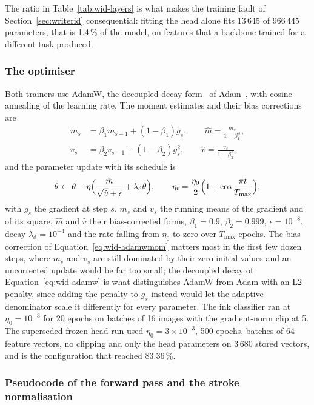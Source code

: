 The ratio in Table~\ref{tab:wid-layers} is what makes the training fault of Section~\ref{sec:writerid} consequential: fitting the head alone fits 13\,645 of 966\,445 parameters, that is 1.4\,\% of the model, on features that a backbone trained for a different task produced.

\subsubsection{The optimiser}

Both trainers use AdamW, the decoupled-decay form~\cite{loshchilov2019} of Adam~\cite{kingma2015}, with cosine annealing of the learning rate.
The moment estimates and their bias corrections are
\begin{align}
m_s&=\beta_1m_{s-1}+(1-\beta_1)g_s,\qquad \hat m=\frac{m_s}{1-\beta_1^{\,s}},\nonumber\\
v_s&=\beta_2v_{s-1}+(1-\beta_2)g_s^2,\qquad \hat v=\frac{v_s}{1-\beta_2^{\,s}},\label{eq:wid-adamwmom}
\end{align}
and the parameter update with its schedule is
\begin{equation}
\theta\leftarrow\theta-\eta\Bigl(\frac{\hat m}{\sqrt{\hat v}+\epsilon}+\lambda_{\mathrm d}\theta\Bigr),\qquad\eta_t=\frac{\eta_0}{2}\Bigl(1+\cos\frac{\pi t}{T_{\max}}\Bigr),\label{eq:wid-adamw}
\end{equation}
with $g_s$ the gradient at step $s$, $m_s$ and $v_s$ the running means of the gradient and of its square, $\hat m$ and $\hat v$ their bias-corrected forms, $\beta_1=0.9$, $\beta_2=0.999$, $\epsilon=10^{-8}$, decay $\lambda_{\mathrm d}=10^{-4}$ and the rate falling from $\eta_0$ to zero over $T_{\max}$ epochs.
The bias correction of Equation~\ref{eq:wid-adamwmom} matters most in the first few dozen steps, where $m_s$ and $v_s$ are still dominated by their zero initial values and an uncorrected update would be far too small; the decoupled decay of Equation~\ref{eq:wid-adamw} is what distinguishes AdamW from Adam with an L2 penalty, since adding the penalty to $g_s$ instead would let the adaptive denominator scale it differently for every parameter.
The ink classifier ran at $\eta_0=10^{-3}$ for 20 epochs on batches of 16 images with the gradient-norm clip at 5.
The superseded frozen-head run used $\eta_0=3\times10^{-3}$, 500 epochs, batches of 64 feature vectors, no clipping and only the head parameters on 3\,680 stored vectors, and is the configuration that reached 83.36\,\%.

\subsubsection{Pseudocode of the forward pass and the stroke normalisation}

